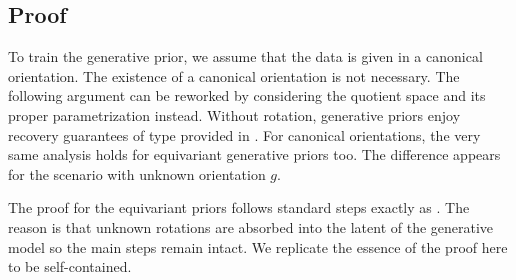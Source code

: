
\subsection{Proof}
To train the generative prior, we assume that the data is given in a canonical orientation. The existence of a canonical orientation is not necessary. The following argument can be reworked by considering the quotient space and its proper parametrization instead. Without rotation, generative priors enjoy recovery guarantees of type provided in \cite{Bora2017-as}. For canonical orientations, the very same analysis holds for equivariant generative priors too.  The difference appears for the scenario with unknown orientation $g$. 

The proof for the equivariant priors follows standard steps exactly as \cite{Bora2017-as}. The reason is that unknown rotations are absorbed into the latent of the generative model so the main steps remain intact. We replicate the essence of the proof here to be self-contained.

